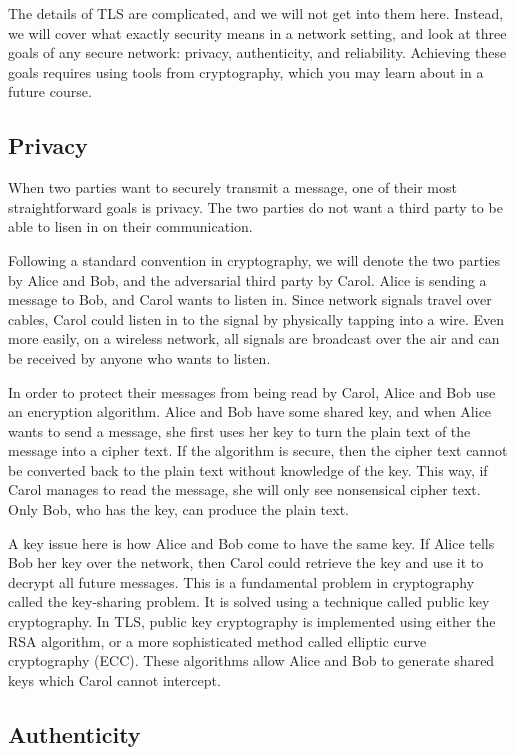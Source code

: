 The details of TLS are complicated, and we will not get into them here. Instead, we will cover what exactly security means in a network setting, and look at three goals of any secure network: privacy, authenticity, and reliability. Achieving these goals requires using tools from cryptography, which you may learn about in a future course.

\subsection{Privacy}

When two parties want to securely transmit a message, one of their most straightforward goals is privacy. The two parties do not want a third party to be able to lisen in on their communication.

Following a standard convention in cryptography, we will denote the two parties by Alice and Bob, and the adversarial third party by Carol. Alice is sending a message to Bob, and Carol wants to listen in. Since network signals travel over cables, Carol could listen in to the signal by physically tapping into a wire. Even more easily, on a wireless network, all signals are broadcast over the air and can be received by anyone who wants to listen.

In order to protect their messages from being read by Carol, Alice and Bob use an encryption algorithm. Alice and Bob have some shared key, and when Alice wants to send a message, she first uses her key to turn the plain text of the message into a cipher text. If the algorithm is secure, then the cipher text cannot be converted back to the plain text without knowledge of the key. This way, if Carol manages to read the message, she will only see nonsensical cipher text. Only Bob, who has the key, can produce the plain text.

A key issue here is how Alice and Bob come to have the same key. If Alice tells Bob her key over the network, then Carol could retrieve the key and use it to decrypt all future messages. This is a fundamental problem in cryptography called the key-sharing problem. It is solved using a technique called public key cryptography. In TLS, public key cryptography is implemented using either the RSA algorithm, or a more sophisticated method called elliptic curve cryptography (ECC). These algorithms allow Alice and Bob to generate shared keys which Carol cannot intercept.

\subsection{Authenticity}

